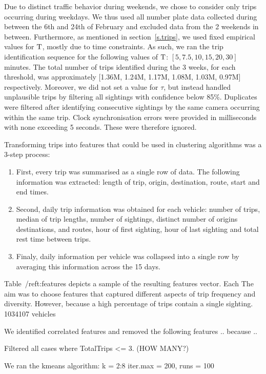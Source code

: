 Due to distinct traffic behavior during weekends, we chose to consider only trips occurring during weekdays. We thus used all number plate data collected during between the 6th and 24th of February and excluded data from the 2 weekends in between. Furthermore, as mentioned in section~\ref{s.trips}, we used fixed empirical values for $\mathrm{T}$, mostly due to time constraints. As such, we ran the trip identification sequence for the following values of $\mathrm{T}$: $[5 , 7.5, 10, 15, 20, 30]$ minutes. The total number of trips identified during the 3 weeks, for each threshold, was approximately [1.36M, 1.24M, 1.17M, 1.08M, 1.03M, 0.97M] respectively. Moreover, we did not set a value for $\tau$, but instead handled unplausible trips by filtering all sightings with confidence below 85\%. Duplicates were filtered after identifying consecutive sightings by the same camera occurring within the same trip. Clock synchronisation errors were provided in milliseconds with none exceeding 5 seconds. These were therefore ignored.

Transforming trips into features that could be used in clustering algorithms was a 3-step process:
\begin{enumerate}
  \item First, every trip was summarised as a single row of data. The following information was extracted: length of trip, origin, destination, route, start and end times.
  \item Second, daily trip information was obtained for each vehicle: number of trips, median of trip lengths, number of sightings, distinct number of origins destinations, and routes, hour of first sighting, hour of last sighting and total rest time between trips.
  \item Finaly, daily information per vehicle was collapsed into a single row by averaging this information across the 15 days.
\end{enumerate}

Table~/ref{t:features} depicts a sample of the resulting features vector. Each  The aim was to choose features that captured different aspects of trip frequency and diversity. However, because a high percentage of trips contain a single sighting. 1034107 vehicles

We identified correlated features and removed the following features .. because ..

Filtered all cases where TotalTrips <= 3. (HOW MANY?)



We ran the kmeans algorithm:
 k = 2:8
 iter.max = 200,
 runs = 100


